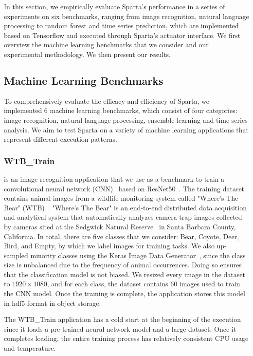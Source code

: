 In this section, we empirically evaluate Sparta's performance in a series of experiments on six benchmarks, ranging from image recognition, natural language processing to random forest and time series prediction, which are implemented based on Tensorflow and executed through Sparta's actuator interface. We first overview the machine learning benchmarks that we consider and our experimental methodology. We then present our results.

\subsection{Machine Learning Benchmarks}

To comprehensively evaluate the efficacy and efficiency of Sparta, we implemented 6 machine learning benchmarks, which consist of four categories: image recognition, natural language processing, ensemble learning and time series analysis. We aim to test Sparta on a variety of machine learning applications that represent different execution patterns.

\subsubsection{WTB\_Train}

is an image recognition application that we use as a benchmark to train a convolutional neural network (CNN)~\cite{ref:cnn} based on ResNet50~\cite{ref:resnet}. The training dataset contains animal images from a wildlife monitoring system called "Where's The Bear" (WTB)~\cite{ref:wtb}. "Where's The Bear" is an end-to-end distributed data acquisition and analytical system that automatically analyzes camera trap images collected by cameras sited at the Sedgwick Natural Reserve~\cite{ref:sedgwick} in Santa Barbara County, California. In total, there are five classes that we consider: Bear, Coyote, Deer, Bird, and Empty, by which we label images for training tasks. We also up-sampled minority classes using the Keras Image Data Generator~\cite{ref:datagen}, since the class size is unbalanced due to the frequency of animal occurrences. Doing so ensures that the classification model is not biased. We resized every image in the dataset to $1920 \times 1080$, and for each class, the dataset contains 60 images used to train the CNN model. Once the training is complete, the application stores this model in hdf5 format in object storage. 

The WTB\_Train application has a cold start at the beginning of the execution since it loads a pre-trained neural network model and a large dataset. Once it completes loading, the entire training process has relatively consistent CPU usage and temperature. 

